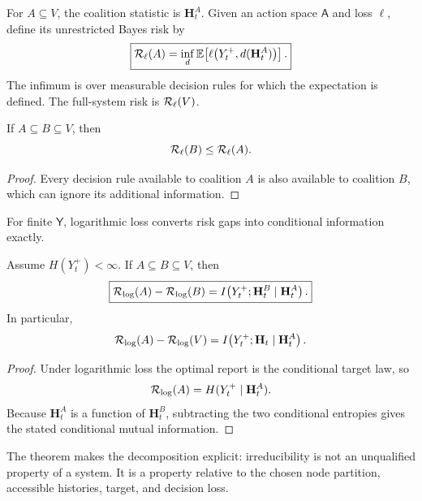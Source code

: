 

For \(A\subseteq V\), the coalition statistic is \(\mathbf H_t^A\). Given an
action space \(\mathsf A\) and loss \(\ell\), define its unrestricted Bayes
risk by
\[
\boxed{
\mathcal R_\ell(A)
=
\inf_d
\mathbb E\!\left[
\ell\bigl(Y_t^+,d(\mathbf H_t^A)\bigr)
\right].
}
\]
The infimum is over measurable decision rules for which the expectation is
defined. The full-system risk is \(\mathcal R_\ell(V)\).

\begin{proposition}\label{prop:coalition-monotonicity}
If \(A\subseteq B\subseteq V\), then
\[
\mathcal R_\ell(B)\leq\mathcal R_\ell(A).
\]
\end{proposition}

\begin{proof}
Every decision rule available to coalition \(A\) is also available to coalition
\(B\), which can ignore its additional information.
\end{proof}

For finite \(\mathsf Y\), logarithmic loss converts risk gaps into conditional
information exactly.

\begin{theorem}\label{thm:coalition-log-risk}
Assume \(H(Y_t^+)<\infty\). If \(A\subseteq B\subseteq V\), then
\[
\boxed{
\mathcal R_{\log}(A)-\mathcal R_{\log}(B)
=
I\!\left(
Y_t^+;\mathbf H_t^B
\mid
\mathbf H_t^A
\right).
}
\]
In particular,
\[
\mathcal R_{\log}(A)-\mathcal R_{\log}(V)
=
I\!\left(
Y_t^+;\mathbf H_t
\mid
\mathbf H_t^A
\right).
\]
\end{theorem}

\begin{proof}
Under logarithmic loss the optimal report is the conditional target law, so
\[
\mathcal R_{\log}(A)=H(Y_t^+\mid\mathbf H_t^A).
\]
Because \(\mathbf H_t^A\) is a function of \(\mathbf H_t^B\), subtracting the
two conditional entropies gives the stated conditional mutual information.
\end{proof}

The theorem makes the decomposition explicit: irreducibility is not an
unqualified property of a system. It is a property relative to the chosen node
partition, accessible histories, target, and decision loss.


